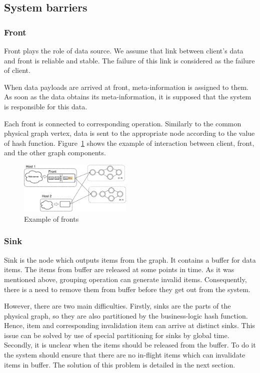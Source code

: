 \subsection{System barriers}

\subsubsection{Front}
Front plays the role of data source. We assume that link between client's data and front is reliable and stable. The failure of this link is considered as the failure of client.

When data payloads are arrived at front, meta-information is assigned to them. As soon as the data obtains its meta-information, it is supposed that the system is responsible for this data. 

Each front is connected to corresponding operation. Similarly to the common physical graph vertex, data is sent to the appropriate node according to the value of hash function. Figure~\ref{front-figure} shows the example of interaction between client, front, and the other graph components.

\begin{figure}[htbp]
  \centering
  \includegraphics[width=0.48\textwidth]{pics/front}
  \caption{Example of fronts}
  \label {front-figure}
\end{figure}

\subsubsection{Sink}
Sink is the node which outputs items from the graph. It contains a buffer for data items. The items from buffer are released at some points in time. As it was mentioned above, grouping operation can generate invalid items. Consequently, there is a need to remove them from buffer before they get out from the system.  

However, there are two main difficulties. Firstly, sinks are the parts of the physical graph, so they are also partitioned by the business-logic hash function. Hence, item and corresponding invalidation item can arrive at distinct sinks. This issue can be solved by use of special partitioning for sinks by global time. Secondly, it is unclear when the items should be released from the buffer. To do it the system should ensure that there are no in-flight items which can invalidate items in buffer. The solution of this problem is detailed in the next section. 

